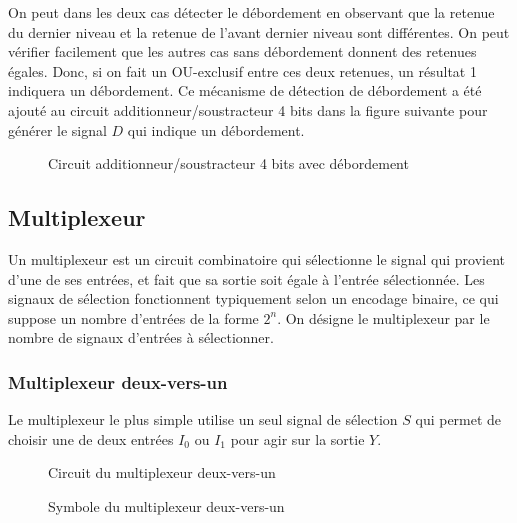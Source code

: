\documentclass[11pt]{article}
\begin{document}
On peut dans les deux cas détecter le débordement en observant que la
retenue du dernier niveau et la retenue de l'avant dernier niveau sont
différentes. On peut vérifier facilement que les autres cas sans
débordement donnent des retenues égales. Donc, si on fait un
OU-exclusif entre ces deux retenues, un résultat 1 indiquera un
débordement. Ce mécanisme de détection de débordement a été ajouté au
circuit additionneur/soustracteur 4 bits dans la figure suivante pour
générer le signal \(D\) qui indique un débordement.

\begin{figure}[htbp]
\centering

\caption{\label{fig:orgf3f5021}Circuit additionneur/soustracteur 4 bits avec débordement}
\end{figure}


\subsection{Multiplexeur}
\label{sec:org89571ed}

Un multiplexeur est un circuit combinatoire qui sélectionne le signal
qui provient d'une de ses entrées, et fait que sa sortie soit égale à
l'entrée sélectionnée. Les signaux de sélection fonctionnent
typiquement selon un encodage binaire, ce qui suppose un nombre
d'entrées de la forme \(2^n\). On désigne le multiplexeur par le
nombre de signaux d'entrées à sélectionner.

\subsubsection{Multiplexeur deux-vers-un}
\label{sec:org7f8f35c}

Le multiplexeur le plus simple utilise un seul signal de sélection
\(S\) qui permet de choisir une de deux entrées \(I_0\) ou \(I_1\)
pour agir sur la sortie \(Y\).

\begin{figure}[htbp]
\centering

\caption{\label{fig:org023e622}Circuit du multiplexeur deux-vers-un}
\end{figure}

\begin{figure}[htbp]
\centering

\caption{\label{fig:orgece5c49}Symbole du multiplexeur deux-vers-un}
\end{figure}
\end{document}
